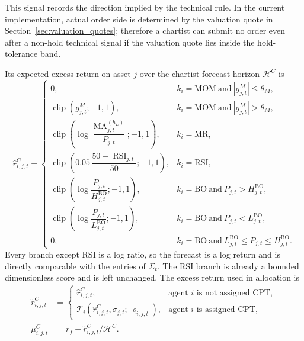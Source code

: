 \documentclass[12pt, a4paper]{article}
\DeclareMathOperator{\clip}{clip}
\DeclareMathOperator{\MA}{MA}
\DeclareMathOperator{\RSI}{RSI}
\begin{document}
    This signal records the direction implied by the technical rule. In the current
    implementation, actual order side is determined by the valuation quote in
    Section~\ref{sec:valuation_quotes}; therefore a chartist can submit no order
    even after a non-hold technical signal if the valuation quote lies inside the
    hold-tolerance band.

    Its expected excess return on asset \(j\) over the chartist forecast horizon
    \(\mathcal H^C\) is
    \[
        \hat r_{i,j,t}^{C}=
        \begin{cases}
            0, & k_i=\mathrm{MOM}\ \text{and}\ |g_{j,t}^M|\le\theta_M,\\[1ex]
            \clip\!\left(g_{j,t}^M;-1,1\right), & k_i=\mathrm{MOM}\ \text{and}\ |g_{j,t}^M|>\theta_M,\\[1ex]
            \clip\!\left(\log\dfrac{\MA_{j,t}^{(h_L)}}{P_{j,t}};-1,1\right), & k_i=\mathrm{MR},\\[1ex]
            \clip\!\left(0.05\,\dfrac{50-\RSI_{j,t}}{50};-1,1\right), & k_i=\mathrm{RSI},\\[1ex]
            \clip\!\left(\log\dfrac{P_{j,t}}{H_{j,t}^{\mathrm{BO}}};-1,1\right), & k_i=\mathrm{BO}\ \text{and}\ P_{j,t}>H_{j,t}^{\mathrm{BO}},\\[1ex]
            \clip\!\left(\log\dfrac{P_{j,t}}{L_{j,t}^{\mathrm{BO}}};-1,1\right), & k_i=\mathrm{BO}\ \text{and}\ P_{j,t}<L_{j,t}^{\mathrm{BO}},\\[1ex]
            0, & k_i=\mathrm{BO}\ \text{and}\ L_{j,t}^{\mathrm{BO}}\le P_{j,t}\le H_{j,t}^{\mathrm{BO}}.
        \end{cases}
    \]
    Every branch except RSI is a log ratio, so the forecast is a log return and is
    directly comparable with the entries of \(\Sigma_t\). The RSI branch is already
    a bounded dimensionless score and is left unchanged.
    The excess return used in allocation is
    \begin{align*}
        \breve r_{i,j,t}^{C}&=
        \begin{cases}
            \hat r_{i,j,t}^{C}, & \text{agent } i \text{ is not assigned CPT},\\
            \mathcal{T}_i\!\left(\hat r_{i,j,t}^{C},\sigma_{j,t};\,\varrho_{i,j,t}\right), & \text{agent } i \text{ is assigned CPT},
        \end{cases}
        \\
        \mu_{i,j,t}^{C}&=r_f+\breve r_{i,j,t}^{C}/\mathcal H^{C}.
    \end{align*}
\end{document}
